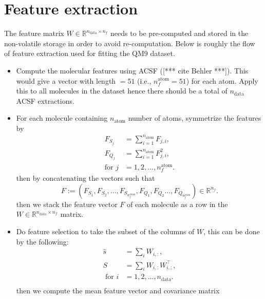 \documentclass[12pt]{article}
\def\att{                    %
        \marginpar[ \hspace*{\fill} \raisebox{-0.2em}{\rule{2mm}{1.2em}} ]
        {\raisebox{-0.2em}{\rule{2mm}{1.2em}} }
        }
\def\at#1{[*** \att #1 ***]}  %
\begin{document}
\section{Feature extraction}
The feature matrix $W \in \mathbb{R}^{n_\text{data} \times n_f}$ needs to be pre-computed and stored in the non-volatile storage in order to avoid re-computation. Below is roughly the flow of feature extraction used for fitting the QM9 dataset.
\begin{itemize}
    \item Compute the molecular features using ACSF (\at{cite Behler}). This would give a vector with length $= 51$ (i.e., $n^\text{atom}_f = 51$) for each atom. Apply this to all molecules in the dataset hence there should be a total of $n_\text{data}$ ACSF extractions.
    \item For each molecule containing $n_\text{atom}$ number of atoms, symmetrize the features by
        \begin{equation}
            \begin{split}
                F_{S_j} &= \sum_{i=1}^{n_{\text{atom}}} F_{j,i},\\
                F_{Q_j} &= \sum_{i=1}^{n_{\text{atom}}} F_{j,i}^2, \\
                \text{for }j &= 1,2,..., n^\text{atom}_f. 
            \end{split}
        \end{equation}
        then by concatenating the vectors such that
        \begin{equation}
            F := (F_{S_1}, F_{S_2}, ..., F_{S_{n^\text{atom}_f}}, F_{Q_1},F_{Q_2} ..., F_{Q_{n^\text{atom}_f}}) \in \mathbb{R}^{n_f}.
        \end{equation}
    	then we stack the feature vector $F$ of each molecule as a row in the $W \in \mathbb{R}^{n_\text{data} \times n_f}$ matrix.
    \item Do feature selection to take the subset of the columns of $W$, this can be done by the following:
	    \begin{equation}
			\begin{split}
				\hat{s} &= \sum_i W_{i,:}, \\
				S &= \sum_i W_{i,:}W_{i,:}^\top, \\
				\text{ for } i &= 1,2,...,n_{\text{data}}. \\
			\end{split}
	    \end{equation}
		then we compute the mean feature vector and covariance matrix

\end{itemize}
\end{document}
